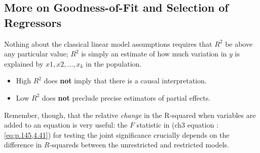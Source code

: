 \documentclass[a4paper, 10pt]{article}
\theoremstyle{definition}	%
\begin{document}
\subsection{More on Goodness-of-Fit and Selection of Regressors}
Nothing about the classical linear model assumptions requires that $R^2$ be above any particular value; $R^2$ is simply an estimate of how much variation in $y$ is explained by $x1, x2,\ldots, x_k$ in the population.
\begin{itemize}
    \item High $R^2$ does \textbf{not} imply that there is a causal interpretation.
    \item Low $R^2$ does \textbf{not} preclude precise estimators of partial effects.
\end{itemize}
Remember, though, that the relative \textit{change} in the R-squared when variables are added to an equation is very useful: the $F$ statistic in (ch3 equation : \ref{eq:p.145,4.41}) for testing the joint significance crucially depends on the difference in $R$-squareds between the unrestricted and restricted models.
\end{document}
